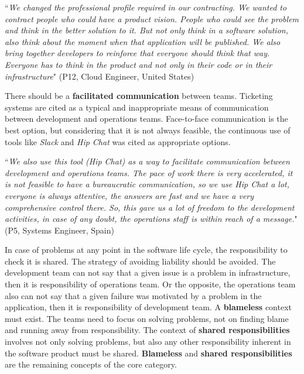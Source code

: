 \begin{mq}
``\emph{We changed the professional profile required in our contracting. We wanted to
contract people who could have a product vision. People who could see the
problem and think in the better solution to it. But not only think in a
software solution, also think about the moment when that application will be
published. We also bring together developers to reinforce that everyone
should think that way. Everyone has to think in the product and not only in
their code or in their infrastructure}" (P12, Cloud Engineer, United States)
\end{mq}

There should be a \textbf{facilitated communication} between teams. Ticketing
systems are cited as a typical and inappropriate means of communication
between development and operations teams. Face-to-face communication is the best
option, but considering that it is not always feasible, the continuous use of
tools like \emph{Slack} and \emph{Hip Chat} was cited as appropriate options.

\begin{mq}
``\emph{We also use this tool (Hip Chat) as a way to facilitate communication between
development and operations teams. The pace of work there is very accelerated,
it is not feasible to have a bureaucratic communication, so we use Hip Chat
a lot, everyone is always attentive, the answers are fast and we have a very
comprehensive control there. So, this gave us a lot of freedom to the development
activities, in case of any doubt, the operations staff is within reach of a
message.}" (P5, Systems Engineer, Spain)
\end{mq}

In case of problems at any point in the software life cycle, the responsibility
to check it is shared. The strategy of avoiding liability should be avoided.
The development team can not say that a given issue is a problem in infrastructure, then
it is responsibility of operations team. Or the opposite, the operations team
also can not say that a given failure was motivated by a problem in the application, then it is
responsibility of development team. A \textbf{blameless} context must exist.
The teams need to focus on solving problems, not on finding blame and
running away from responsibility. The context of \textbf{shared
responsibilities} involves not only solving problems, but also any other
responsibility inherent in the software product must be shared.
\textbf{Blameless} and \textbf{shared responsibilities} are the remaining
concepts of the core category.

